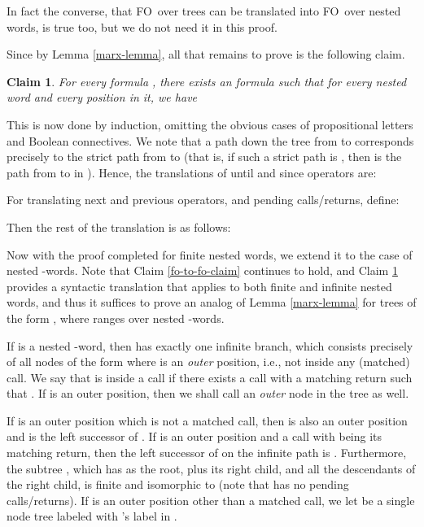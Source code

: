 \documentclass{LMCS}
\newcommand{\FO}{{\rm FO}}
\theoremstyle{plain}
\newtheorem{claim}[theorem]{Claim}
\theoremstyle{definition}
\begin{document}
{In fact the converse, that \FO\ over trees  can be translated
into \FO\ over nested words, is true too, but we do not need it in this
proof.

Since  by Lemma \ref{marx-lemma}, all that remains to
prove is the following claim.

\begin{claim} 
\label{tltree-to-nwtl}
For every  formula , there exists an  formula
 such that for every nested word  and every position 
in it, we have 

\end{claim}

This is now done by induction, omitting the obvious cases of
propositional letters and Boolean connectives. 
We note that a path down the tree from  to 
corresponds precisely to the strict path from  to  (that
is, if such a strict path is , then
 is the path from  to
 in ). Hence, the translations of until and since
operators are:

For translating next and previous operators, and pending calls/returns, define:

Then the rest of the translation is as follows:

Now with the proof completed for finite nested words, we extend it to
the case of nested -words. Note that Claim
\ref{fo-to-fo-claim} continues to hold, and Claim
\ref{tltree-to-nwtl} provides a syntactic translation that applies to
both finite and infinite nested words, and thus it suffices to  prove an
analog of Lemma \ref{marx-lemma} for trees of the form , where
 ranges over nested -words. 

If  is a nested -word, then  has exactly one
infinite branch, which consists precisely of all nodes of the form  where  is an
{\em outer} position, i.e., not inside any (matched) call. We say that  is
inside a call if there exists a call  with a matching return 
such that . If  is an outer position, then we
shall call  an {\em outer} node in the tree  as well.

If  is an outer position which is not a matched call, then  is
also an outer position and
 is the left successor of . If  is an outer
position and a call with  being its matching return, then the
left successor of  on the infinite path is
. Furthermore, the subtree , which has  as the
root, plus its right child, and all the descendants of the right child, is
finite and isomorphic to  (note that  has no
pending calls/returns). If  is an outer position other than a
matched call, we let  be a
single node tree labeled with 's label in .

}
\end{document}
